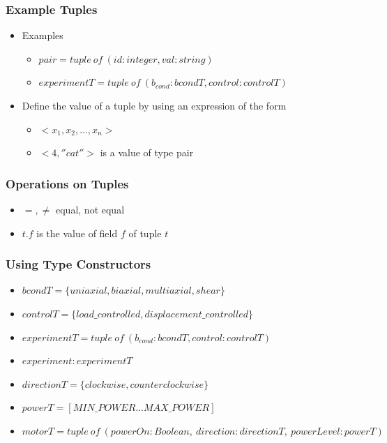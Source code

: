 \documentclass[t,12pt,numbers,fleqn]{beamer}
\begin{document}
\begin{frame}
\frametitle{Example Tuples}
\begin{itemize}
\item Examples
\begin{itemize}
\item $pair = tuple~of~(id: integer, val: string)$
\item $experimentT = tuple~of~(b_{cond}: bcondT, control: controlT)$
\end{itemize}
\item Define the value of a tuple by using an expression of the form
\begin{itemize}
\item $<x_1, x_2, ..., x_n >$
\item $<4, ''cat''>$ is a value of type pair
\end{itemize}
\end{itemize}
\end{frame}


\begin{frame}
\frametitle{Operations on Tuples}
\begin{itemize}
\item $=, \neq$ equal, not equal
\item $t.f$ is the value of field $f$ of tuple $t$
\end{itemize}
\end{frame}


\begin{frame}
\frametitle{Using Type Constructors}
\begin{itemize}
\item $bcondT = \{ uniaxial, biaxial, multiaxial, shear \}$
\item $controlT = \{ load\_controlled, displacement\_controlled \}$
\item $experimentT = tuple~of~(b_{cond}: bcondT, control: controlT)$
\item $experiment: experimentT$
\item $directionT = \{clockwise, counterclockwise \}$
\item $powerT = [MIN\_POWER ... MAX\_POWER]$
\item $motorT = tuple~of~ (powerOn: Boolean,~direction: directionT,~powerLevel: powerT)$
\end{itemize}
\end{frame}
\end{document}
